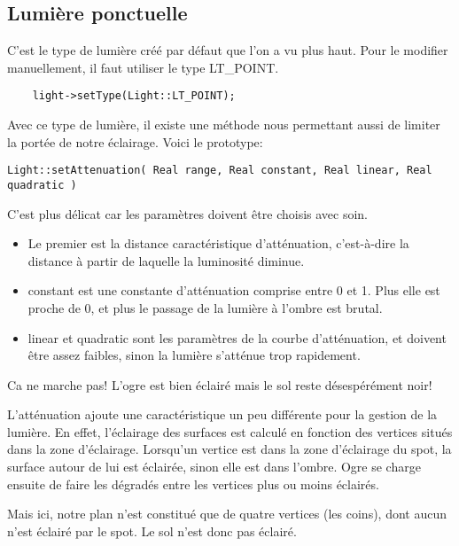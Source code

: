 \subsection{Lumi\`ere ponctuelle}
C'est le type de lumi\`ere cr\'e\'e par d\'efaut que l'on a vu plus haut. Pour le modifier manuellement, il faut utiliser le type LT\_POINT.

\begin{lstlisting}
	light->setType(Light::LT_POINT);
\end{lstlisting}


Avec ce type de lumi\`ere, il existe une m\'ethode nous permettant aussi de limiter la port\'ee de notre \'eclairage. Voici le prototype:
\begin{lstlisting}
Light::setAttenuation( Real range, Real constant, Real linear, Real quadratic )
\end{lstlisting}



C'est plus d\'elicat car les param\`etres doivent \^etre choisis avec soin. 
\begin{itemize}
\item Le premier est la distance caract\'eristique d'att\'enuation, c'est-\`{a}-dire la distance \`{a} partir de laquelle la luminosit\'e diminue. 
\item constant est une constante d'att\'enuation comprise entre 0 et 1. Plus elle est proche de 0, et plus le passage de la lumi\`ere \`{a} l'ombre est brutal.
\item linear et quadratic sont les param\`etres de la courbe d'att\'enuation, et doivent \^etre assez faibles, sinon la lumi\`ere s'att\'enue trop rapidement.
\end{itemize}
	


Ca ne marche pas! L'ogre est bien \'eclair\'e mais le sol reste d\'esesp\'er\'ement noir!

L'att\'enuation ajoute une caract\'eristique un peu diff\'erente pour la gestion de la lumi\`ere. En effet, l'\'eclairage des surfaces est calcul\'e en fonction des vertices situ\'es dans la zone d'\'eclairage. Lorsqu'un vertice est dans la zone d'\'eclairage du spot, la surface autour de lui est \'eclair\'ee, sinon elle est dans l'ombre. Ogre se charge ensuite de faire les d\'egrad\'es entre les vertices plus ou moins \'eclair\'es.

Mais ici, notre plan n'est constitu\'e que de quatre vertices (les coins), dont aucun n'est \'eclair\'e par le spot. Le sol n'est donc pas \'eclair\'e.

